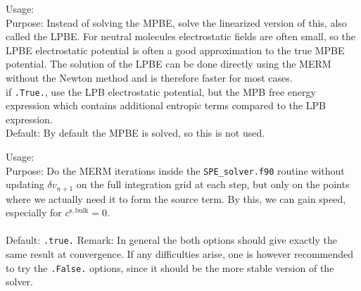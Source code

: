 {
  \noindent
  Usage:   \\[1.0ex]
  Purpose: Instead of solving the MPBE, solve the linearized version of this, also called the LPBE. For neutral molecules electrostatic fields are often small, so the LPBE electrostatic potential is often a good approximation to the true MPBE potential. The solution of the LPBE can be done directly using the MERM without the Newton method and is therefore faster for most cases. \\[1.0ex]
   if \texttt{.True.}, use the LPB electrostatic potential, but the MPB free energy expression which contains additional entropic terms compared to the LPB expression. \\[1.0ex]
  Default: By default the MPBE is solved, so this is not used. 
}

{
  \noindent
  Usage:   \\[1.0ex]
  Purpose: Do the MERM iterations inside the \texttt{SPE\_solver.f90} routine without updating $\delta v_{n+1}$ on the full integration grid at each step, but only on the points where we actually need it to form the source term. By this, we can gain speed, especially for $c^\mathrm{s,bulk}=0$. \\[1.0ex]
   \\[1.0ex]
  Default: \texttt{.true.} 
  Remark: In general the both options should give exactly the same result at convergence. If any difficulties arise, one is however recommended to try the \texttt{.False.} options, since it should be the more stable version of the solver.
}

